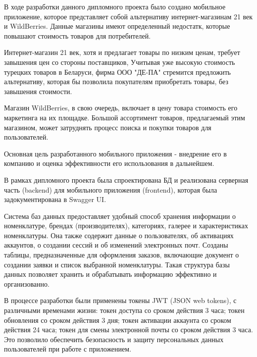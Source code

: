 В ходе разработки данного дипломного проекта было создано мобильное приложение,
которое представляет собой альтернативу интернет-магазинам 21 век и WildBerries.
Данные магазины имеют определенный недостатк, которые повышают стоимость товаров для потребителей.

Интернет-магазин 21 век, хотя и предлагает товары по низким ценам,
требует завышения цен со стороны поставщиков,
Учитывая уже высокую стоимость турецких товаров в Беларуси,
фирма ООО "ДЕ-ПА" стремится предложить альтернативу, которая бы позволила покупателям приобретать товары,
без завышения стоимости.

Магазин WildBerries, в свою очередь, включает в цену товара стоимость его маркетинга на их площадке.
Большой ассортимент товаров, предлагаемый этим магазином, может затруднять процесс поиска и покупки товаров для пользователей.

Основная цель разработанного мобильного приложения - внедрение его в компанию и оценка эффективности его использования в дальнейшем. 

В рамках дипломного проекта была спроектирована БД и реализована серверная часть (backend)
для мобильного приложения (frontend),
которая была задокументирована в Swagger UI.

Система баз данных предоставляет удобный способ хранения информации о номенклатуре, брендах (производителях),
категориях, галерее и характеристиках номенклатуры.
Она также содержит данные о пользователях, об активациях аккаунтов, о создании сессий и об изменений электронных почт.
Созданы таблицы, предназначенные для оформления заказов, включающие документ о создании заявки и список выбранной номенклатуры.
Такая структура базы данных позволяет хранить и обрабатывать информацию эффективно и организованно.




В процессе разработки были применены токены JWT (JSON web tokens), с различными временами жизни:
токен доступа со сроком действия 3 часа;
токен обновления со сроком действия 3 дня;
токен активации аккаунта со сроком действия 24 часа;
токен для смены электронной почты со сроком действия 3 часа.
Это позволило обеспечить безопасность и защиту персональных данных пользователей при работе с приложением.
